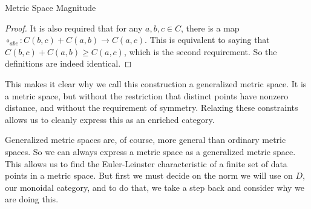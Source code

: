 \documentclass[12pt]{pom_thesis}
\begin{document}
\begin{chapter}{Metric Space Magnitude}
\begin{proof}
It is also required that for any $a,b,c \in C$, there is a map $\circ_{abc}: C(b,c) + C(a,b) \rightarrow C(a,c)$. This is equivalent to saying that $C(b,c) + C(a,b) \geq C(a,c)$, which is the second requirement. So the definitions are indeed identical.
\end{proof}

This makes it clear why we call this construction a generalized metric space. It is a metric space, but without the restriction that distinct points have nonzero distance, and without the requirement of symmetry. Relaxing these constraints allows us to cleanly express this as an enriched category.  

Generalized metric spaces are, of course, more general than ordinary metric spaces. So we can always express a metric space as a generalized metric space. This allows us to find the Euler-Leinster characteristic of a finite set of data points in a metric space. But first we must decide on the norm we will use on $D$, our monoidal category, and to do that, we take a step back and consider why we are doing this.


\end{chapter}
\end{document}

